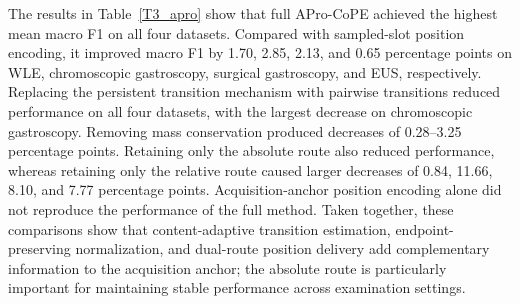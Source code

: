\documentclass[Afour,sagev,times]{sagej}
\begin{document}
The results in Table~\ref{T3_apro} show that full APro-CoPE achieved the highest mean macro F1 on all four datasets. Compared with sampled-slot position encoding, it improved macro F1 by 1.70, 2.85, 2.13, and 0.65 percentage points on WLE, chromoscopic gastroscopy, surgical gastroscopy, and EUS, respectively. Replacing the persistent transition mechanism with pairwise transitions reduced performance on all four datasets, with the largest decrease on chromoscopic gastroscopy. Removing mass conservation produced decreases of 0.28--3.25 percentage points. Retaining only the absolute route also reduced performance, whereas retaining only the relative route caused larger decreases of 0.84, 11.66, 8.10, and 7.77 percentage points. Acquisition-anchor position encoding alone did not reproduce the performance of the full method. Taken together, these comparisons show that content-adaptive transition estimation, endpoint-preserving normalization, and dual-route position delivery add complementary information to the acquisition anchor; the absolute route is particularly important for maintaining stable performance across examination settings.
\end{document}
